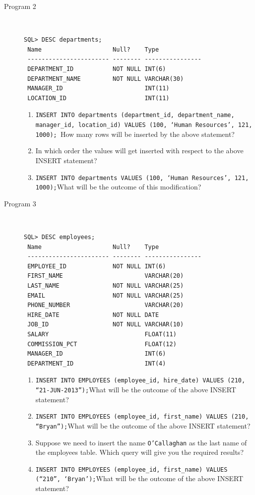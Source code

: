 \documentclass[11pt,a4paper]{article}
\def\AnswerBox{\fbox{\begin{minipage}{4in}\hfill\vspace{0.5in}\end{minipage}}}
\begin{document}
\begin{description}
\item [Program 2]\ 
\begin{verbatim}
SQL> DESC departments;
 Name                    Null?    Type
 ----------------------- -------- ----------------
 DEPARTMENT_ID           NOT NULL INT(6)
 DEPARTMENT_NAME         NOT NULL VARCHAR(30)
 MANAGER_ID                       INT(11)
 LOCATION_ID                      INT(11)
\end{verbatim}
\AnswerBox

\begin{enumerate}[label=\bfseries Q\arabic*:]\itemsep10pt
\item \texttt{INSERT INTO departments (department\_id, department\_name, manager\_id, location\_id)
VALUES (100, `Human Resources', 121, 1000); }\newline How many rows will be inserted by the above statement?
\item In which order the values will get inserted with respect to the above INSERT statement?
\item \texttt{INSERT INTO departments VALUES (100, `Human Resources', 121, 1000);}\newline What will be the outcome of this modification?
\end{enumerate}

\item[Program 3]\
\begin{verbatim}
SQL> DESC employees;
 Name                    Null?    Type
 ----------------------- -------- ----------------
 EMPLOYEE_ID             NOT NULL INT(6)
 FIRST_NAME                       VARCHAR(20)
 LAST_NAME               NOT NULL VARCHAR(25)
 EMAIL                   NOT NULL VARCHAR(25)
 PHONE_NUMBER                     VARCHAR(20)
 HIRE_DATE               NOT NULL DATE
 JOB_ID                  NOT NULL VARCHAR(10)
 SALARY                           FLOAT(11)
 COMMISSION_PCT                   FLOAT(12)
 MANAGER_ID                       INT(6)
 DEPARTMENT_ID                    INT(4)
\end{verbatim}

\AnswerBox

\begin{enumerate}[label=\bfseries Q\arabic*:]\itemsep10pt
\item \texttt{INSERT INTO EMPLOYEES (employee\_id, hire\_date) VALUES (210, ``21-JUN-2013'');}\newline What will be the outcome of the above INSERT statement?
\item \texttt{INSERT INTO EMPLOYEES (employee\_id, first\_name) VALUES (210, ``Bryan'');}\newline What will be the outcome of the above INSERT statement?
\item Suppose we need to insert the name \texttt{O'Callaghan} as the last name of the employees table. Which query will give you the required results?
\item \texttt{INSERT INTO EMPLOYEES (employee\_id, first\_name) VALUES (``210'', `Bryan');}\newline What will be the outcome of the above INSERT statement?
\end{enumerate}


\end{description}
\end{document}
